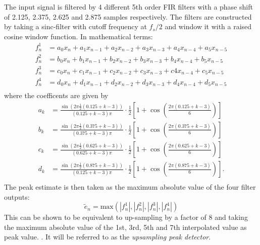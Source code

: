 \documentclass[../main2.tex]{subfiles}
\begin{document}
The input signal is filtered by 4 different 5th order FIR filters with a phase shift of 2.125, 2.375, 2.625 and 2.875 samples respectively. The filters are constructed by taking a sinc-filter with cutoff frequency at $f_s/2$ and window it with a raised cosine window function. In mathematical terms:
\begin{equation}
\begin{split}
f^1_n &= a_0 x_{n} + a_1 x_{n-1} + a_2 x_{n-2} + a_3 x_{n-3} + a_4 x_{n-4} + a_5 x_{n-5} \\
f^2_n &= b_0 x_{n} + b_1 x_{n-1} + b_2 x_{n-2} + b_3 x_{n-3} + b_4 x_{n-4} + b_5 x_{n-5} \\
f^3_n &= c_0 x_{n} + c_1 x_{n-1} + c_2 x_{n-2} + c_3 x_{n-3} + c4 x_{n-4} + c_5 x_{n-5} \\
f^4_n &= d_0 x_{n} + d_1 x_{n-1} + d_2 x_{n-2} + d_3 x_{n-3} + d_4 x_{n-4} + d_5 x_{n-5} \\
\end{split}
\end{equation}
where the coefficents are given by
\begin{equation}
\begin{split}
a_k &= \frac{\sin (2 \pi \frac{1}{2} (0.125+k-3) )}{(0.125+k-3)\pi} \cdot \frac{1}{2}\left[1+\cos \left(\frac{2 \pi (0.125+k-3)}{6} \right) \right] \\
b_k &= \frac{\sin (2 \pi \frac{1}{2} (0.375+k-3) )}{(0.375+k-3)\pi} \cdot \frac{1}{2}\left[1+\cos \left(\frac{2 \pi (0.375+k-3)}{6} \right) \right] \\
c_k &= \frac{\sin (2 \pi \frac{1}{2} (0.625+k-3) )}{(0.625+k-3)\pi} \cdot \frac{1}{2}\left[1+\cos \left(\frac{2 \pi (0.625+k-3)}{6} \right) \right] \\
d_k &= \frac{\sin (2 \pi \frac{1}{2} (0.875+k-3) )}{(0.125+k-3)\pi} \cdot \frac{1}{2}\left[1+\cos \left(\frac{2 \pi (0.875+k-3)}{6} \right) \right]. \\
\end{split}
\end{equation}
The peak estimate is then taken as the maximum absolute value of the four filter outputs:
\begin{equation}
\tilde{e}_n = \text{max}(|f^1_n|, |f^2_n|, |f^3_n|, |f^4_n|)
\end{equation}
This can be shown to be equivalent to up-sampling by a factor of 8 and taking the maximum absolute value of the 1st, 3rd, 5th and 7th interpolated value as peak value. . It will be referred to as the \emph{upsampling peak detector}.
\end{document}

